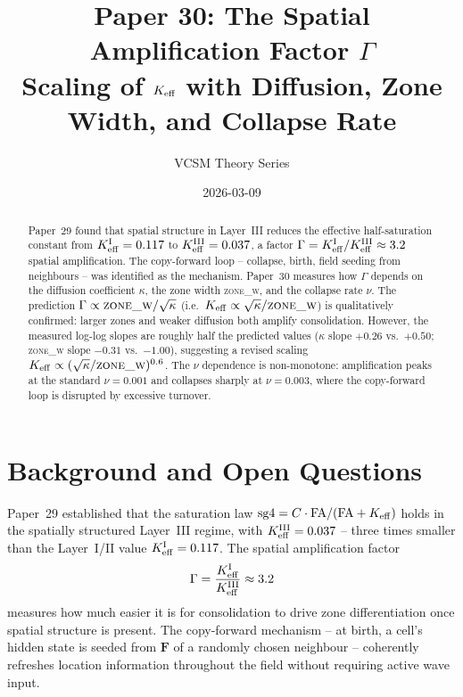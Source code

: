 \documentclass[11pt,a4paper]{article}
\title{\textbf{Paper 30: The Spatial Amplification Factor $\Gamma$}\\
\large Scaling of $K_{\rm eff}$ with Diffusion, Zone Width, and Collapse Rate}
\author{VCSM Theory Series}
\date{2026-03-09}
\begin{document}
\maketitle

\begin{abstract}
Paper~29 found that spatial structure in Layer~III reduces the effective half-saturation
constant from $K_{\rm eff}^{\rm I}=0.117$ to $K_{\rm eff}^{\rm III}=0.037$, a factor
$\Gamma = K_{\rm eff}^{\rm I}/K_{\rm eff}^{\rm III} \approx 3.2$ spatial amplification.
The copy-forward loop -- collapse, birth, field seeding from neighbours -- was identified as
the mechanism. Paper~30 measures how $\Gamma$ depends on the diffusion coefficient $\kappa$,
the zone width \textsc{zone\_w}, and the collapse rate $\nu$.  The prediction
$\Gamma \propto \textsc{zone\_w}/\sqrt{\kappa}$ (i.e.\
$K_{\rm eff} \propto \sqrt{\kappa}/\textsc{zone\_w}$) is qualitatively confirmed: larger
zones and weaker diffusion both amplify consolidation.  However, the measured log-log slopes
are roughly half the predicted values ($\kappa$ slope $+0.26$ vs.\ $+0.50$;
\textsc{zone\_w} slope $-0.31$ vs.\ $-1.00$), suggesting a revised scaling
$K_{\rm eff} \propto (\sqrt{\kappa}/\textsc{zone\_w})^{0.6}$.  The $\nu$ dependence is
non-monotone: amplification peaks at the standard $\nu=0.001$ and collapses sharply at
$\nu=0.003$, where the copy-forward loop is disrupted by excessive turnover.
\end{abstract}

\section{Background and Open Questions}
\label{sec:background}

Paper~29 established that the saturation law $\mathrm{sg4} = C \cdot \mathrm{FA}/(
\mathrm{FA}+K_{\rm eff})$ holds in the spatially structured Layer~III regime, with
$K_{\rm eff}^{\rm III}=0.037$ -- three times smaller than the Layer~I/II value
$K_{\rm eff}^{\rm I}=0.117$.  The spatial amplification factor
\begin{equation}
\Gamma = \frac{K_{\rm eff}^{\rm I}}{K_{\rm eff}^{\rm III}} \approx 3.2
\label{eq:gamma_def}
\end{equation}
measures how much easier it is for consolidation to drive zone differentiation once
spatial structure is present.  The copy-forward mechanism -- at birth, a cell's hidden
state is seeded from $\mathbf{F}$ of a randomly chosen neighbour -- coherently refreshes
location information throughout the field without requiring active wave input.
\end{document}
